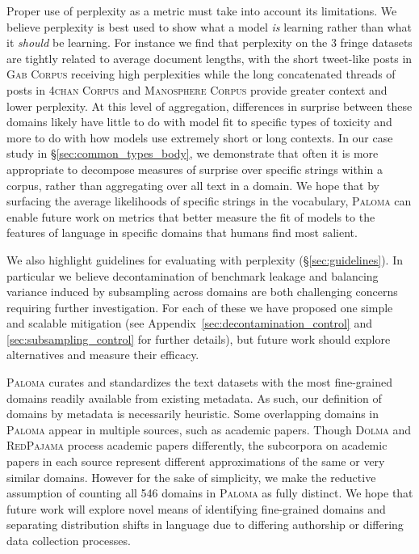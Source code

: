 Proper use of perplexity as a metric must take into account its limitations. We believe perplexity is best used to show what a model \textit{is} learning rather than what it \textit{should} be learning. For instance we find that perplexity on the 3 fringe datasets are tightly related to average document lengths, with the short tweet-like posts in \textsc{Gab Corpus} receiving high perplexities while the long concatenated threads of posts in \textsc{4chan Corpus} and \textsc{Manosphere Corpus} provide greater context and lower perplexity. At this level of aggregation, differences in surprise between these domains likely have little to do with model fit to specific types of toxicity and more to do with how models use extremely short or long contexts. In our case study in \S\ref{sec:common_types_body}, we demonstrate that often it is more appropriate to decompose measures of surprise over specific strings within a corpus, rather than aggregating over all text in a domain. We hope that by surfacing the average likelihoods of specific strings in the vocabulary, \textsc{Paloma} can enable future work on metrics that better measure the fit of models to the features of language in specific domains that humans find most salient.

We also highlight guidelines for evaluating with perplexity (\S\ref{sec:guidelines}). In particular we believe decontamination of benchmark leakage and balancing variance induced by subsampling across domains are both challenging concerns requiring further investigation. For each of these we have proposed one simple and scalable mitigation (see Appendix~\ref{sec:decontamination_control} and \ref{sec:subsampling_control} for further details), but future work should explore alternatives and measure their efficacy.

\textsc{Paloma} curates and standardizes the text datasets with the most fine-grained domains readily available from existing metadata. As such, our definition of domains by metadata is necessarily heuristic. Some overlapping domains in \textsc{Paloma} appear in multiple sources, such as academic papers. Though \textsc{Dolma} and \textsc{RedPajama} process academic papers differently, the subcorpora on academic papers in each source represent different approximations of the same or very similar domains. However for the sake of simplicity, we make the reductive assumption of counting all 546 domains in \textsc{Paloma} as fully distinct. We hope that future work will explore novel means of identifying fine-grained domains and separating distribution shifts in language due to differing authorship or differing data collection processes.



